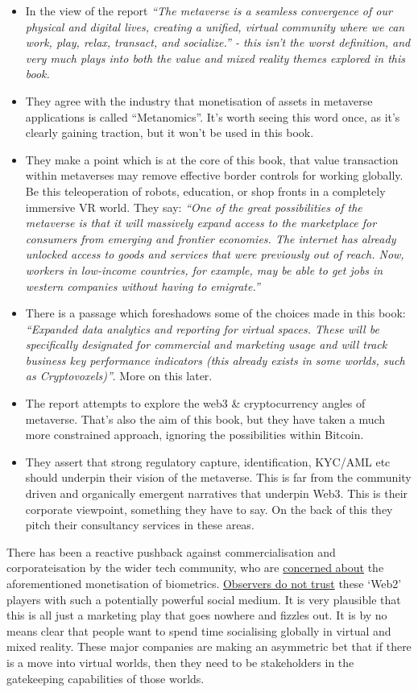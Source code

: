 \begin{itemize}
\item In the view of the report \textit{``The metaverse is a seamless convergence of our physical and digital lives, creating a unified, virtual community where we can work, play, relax, transact, and socialize.'' - this isn't the worst definition, and very much plays into both the value and mixed reality themes explored in this book.}
\item They agree with the industry that monetisation of assets in metaverse applications is called ``Metanomics''. It's worth seeing this word once, as it's clearly gaining traction, but it won't be used in this book.
\item They make a point which is at the core of this book, that value transaction within metaverses may remove effective border controls for working globally. Be this teleoperation of robots, education, or shop fronts in a completely immersive VR world. They say: \textit{``One of the great possibilities of the metaverse is that it will massively expand access to the marketplace for consumers from emerging and frontier economies. The internet has already unlocked access to goods and services that were previously out of reach. Now, workers in low-income countries, for example, may be able to get jobs in western companies without having to emigrate.''}
\item There is a passage which foreshadows some of the choices made in this book: \textit{``Expanded data analytics and reporting for virtual spaces. These will be specifically designated for commercial and marketing usage and will track business key performance indicators (this
already exists in some worlds, such as Cryptovoxels)''}. More on this later.
\item The report attempts to explore the web3 \& cryptocurrency angles of metaverse. That's also the aim of this book, but they have taken a much more constrained approach, ignoring the possibilities within Bitcoin.
\item They assert that strong regulatory capture, identification, KYC/AML etc should underpin their vision of the metaverse. This is far from the community driven and organically emergent narratives that underpin Web3. This is their corporate viewpoint, something they have to say. On the back of this they pitch their consultancy services in these areas.
\end{itemize}
There has been a reactive pushback against commercialisation and corporateisation by the wider tech community, who are \href{https://www.metaversethics.org/p/mde02-metaverse-data-privacy-1}{concerned about} the aforementioned monetisation of biometrics. \href{https://www.coindesk.com/layer2/2022/01/19/meta-leans-in-to-tracking-your-emotions-in-the-metaverse/}{Observers do not trust} these `Web2' players with such a potentially powerful social medium. It is very plausible that this is all just a marketing play that goes nowhere and fizzles out. It is by no means clear that people want to spend time socialising globally in virtual and mixed reality. These major companies are  making an asymmetric bet that if there is a move into virtual worlds, then they need to be stakeholders in the gatekeeping capabilities of those worlds.
